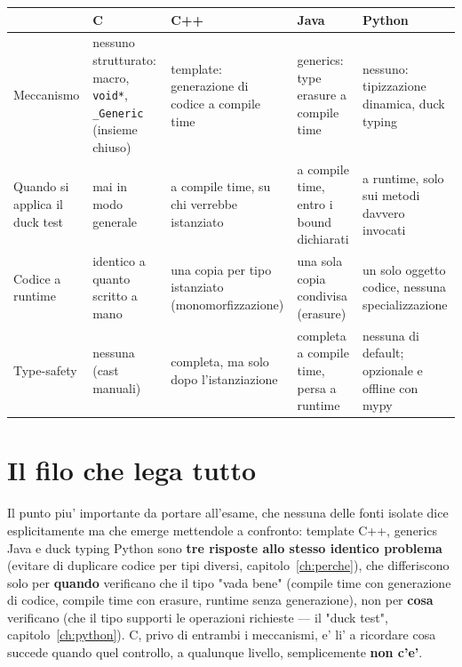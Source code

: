 \documentclass{report}
\newcommand{\code}[1]{\texttt{\small #1}}
\begin{document}
\begin{center}
\renewcommand{\arraystretch}{1.4}
\setlength{\tabcolsep}{4pt}
\footnotesize
\begin{tabular}{|>{\raggedright\arraybackslash}p{2.0cm}|>{\raggedright\arraybackslash}p{3.0cm}|>{\raggedright\arraybackslash}p{3.0cm}|>{\raggedright\arraybackslash}p{3.0cm}|>{\raggedright\arraybackslash}p{2.6cm}|}
\hline
 & \textbf{C} & \textbf{C++} & \textbf{Java} & \textbf{Python} \\
\hline
Meccanismo & nessuno strutturato: macro, \code{void*}, \code{\_Generic} (insieme chiuso) & template: generazione di codice a compile time & generics: type erasure a compile time & nessuno: tipizzazione dinamica, duck typing \\
\hline
Quando si applica il duck test & mai in modo generale & a compile time, su chi verrebbe istanziato & a compile time, entro i bound dichiarati & a runtime, solo sui metodi davvero invocati \\
\hline
Codice a runtime & identico a quanto scritto a mano & una copia per tipo istanziato (monomorfizzazione) & una sola copia condivisa (erasure) & un solo oggetto codice, nessuna specializzazione \\
\hline
Type-safety & nessuna (cast manuali) & completa, ma solo dopo l'istanziazione & completa a compile time, persa a runtime & nessuna di default; opzionale e offline con mypy \\
\hline
\end{tabular}
\end{center}

\section{Il filo che lega tutto}

Il punto piu' importante da portare all'esame, che nessuna delle fonti
isolate dice esplicitamente ma che emerge mettendole a confronto: template
C++, generics Java e duck typing Python sono \textbf{tre risposte allo
stesso identico problema} (evitare di duplicare codice per tipi diversi,
capitolo~\ref{ch:perche}), che differiscono solo per \textbf{quando}
verificano che il tipo "vada bene" (compile time con generazione di codice,
compile time con erasure, runtime senza generazione), non per \textbf{cosa}
verificano (che il tipo supporti le operazioni richieste --- il "duck test",
capitolo~\ref{ch:python}). C, privo di entrambi i meccanismi, e' li' a
ricordare cosa succede quando quel controllo, a qualunque livello, semplicemente
\textbf{non c'e'}.
\end{document}
